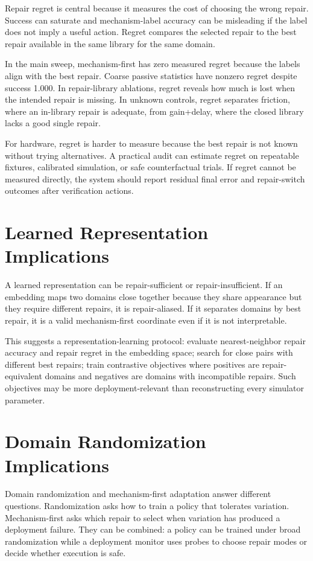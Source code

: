 \documentclass{article}
\begin{document}
Repair regret is central because it measures the cost of choosing the wrong
repair. Success can saturate and mechanism-label accuracy can be misleading if
the label does not imply a useful action. Regret compares the selected repair to
the best repair available in the same library for the same domain.

In the main sweep, mechanism-first has zero measured regret because the labels
align with the best repair. Coarse passive statistics have nonzero regret
despite success 1.000. In repair-library ablations, regret reveals how much is
lost when the intended repair is missing. In unknown controls, regret separates
friction, where an in-library repair is adequate, from gain+delay, where the
closed library lacks a good single repair.

For hardware, regret is harder to measure because the best repair is not known
without trying alternatives. A practical audit can estimate regret on repeatable
fixtures, calibrated simulation, or safe counterfactual trials. If regret cannot
be measured directly, the system should report residual final error and
repair-switch outcomes after verification actions.

\section{Learned Representation Implications}

A learned representation can be repair-sufficient or repair-insufficient. If an
embedding maps two domains close together because they share appearance but they
require different repairs, it is repair-aliased. If it separates domains by best
repair, it is a valid mechanism-first coordinate even if it is not interpretable.

This suggests a representation-learning protocol: evaluate nearest-neighbor
repair accuracy and repair regret in the embedding space; search for close pairs
with different best repairs; train contrastive objectives where positives are
repair-equivalent domains and negatives are domains with incompatible repairs.
Such objectives may be more deployment-relevant than reconstructing every
simulator parameter.

\section{Domain Randomization Implications}

Domain randomization and mechanism-first adaptation answer different questions.
Randomization asks how to train a policy that tolerates variation.
Mechanism-first asks which repair to select when variation has produced a
deployment failure. They can be combined: a policy can be trained under broad
randomization while a deployment monitor uses probes to choose repair modes or
decide whether execution is safe.
\end{document}
